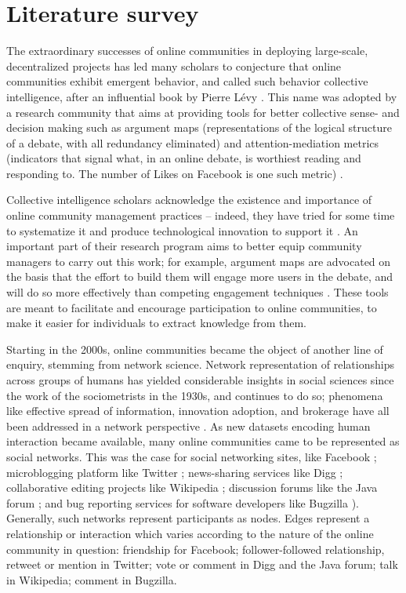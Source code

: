 \section{Literature survey}

The extraordinary successes of online communities in deploying large-scale, decentralized projects has led many scholars to conjecture that online communities exhibit emergent behavior, and called such behavior collective intelligence, after an influential book by Pierre Lévy \cite{pierre1997collective}. This name was adopted by a research community that aims at providing tools for better collective sense- and decision making such as argument maps (representations of the logical structure of a debate, with all redundancy eliminated) \cite{shum2003roots} and attention-mediation metrics (indicators that signal what, in an online debate, is worthiest reading and responding to. The number of Likes on Facebook is one such metric) \cite{klein2012enabling}. 

Collective intelligence scholars acknowledge the existence and importance of online community management practices – indeed, they have tried for some time to systematize it \cite{blondel2008fast, diplaris2011emerging} and produce technological innovation to support it \cite{de2012contested}. An important part of their research program aims to better equip community managers to carry out this work; for example, argument maps are advocated on the basis that the effort to build them will engage more users in the debate, and will do so more effectively than competing engagement techniques \cite{shum2003roots}. These tools are meant to facilitate and encourage participation to online communities, to make it easier for individuals to extract knowledge from them.

Starting in the 2000s, online communities became the object of another line of enquiry, stemming from network science. Network representation of relationships across groups of humans has yielded considerable insights in social sciences since the work of the sociometrists in the 1930s, and continues to do so; phenomena like effective spread of information, innovation adoption, and brokerage have all been addressed in a network perspective \cite{borgatti2009network, burt2009structural}. As new datasets encoding human interaction became available, many online communities came to be represented as social networks. This was the case for social networking sites, like Facebook \cite{lewis2008tastes, nick2013toward}; microblogging platform like Twitter \cite{kunegis2013preferential, java2007we, hodas2014simple}; news-sharing services like Digg \cite{hodas2014simple}; collaborative editing projects like Wikipedia \cite{laniado2011wikipedians}; discussion forums like the Java forum \cite{zhang2007expertise}; and bug reporting services for software developers like Bugzilla \cite{zanetti2012quantitative}). Generally, such networks represent participants as nodes. Edges represent a relationship or interaction which varies according to the nature of the online community in question: friendship for Facebook; follower-followed relationship, retweet or mention in Twitter; vote or comment in Digg and the Java forum; talk in Wikipedia; comment in Bugzilla. 

